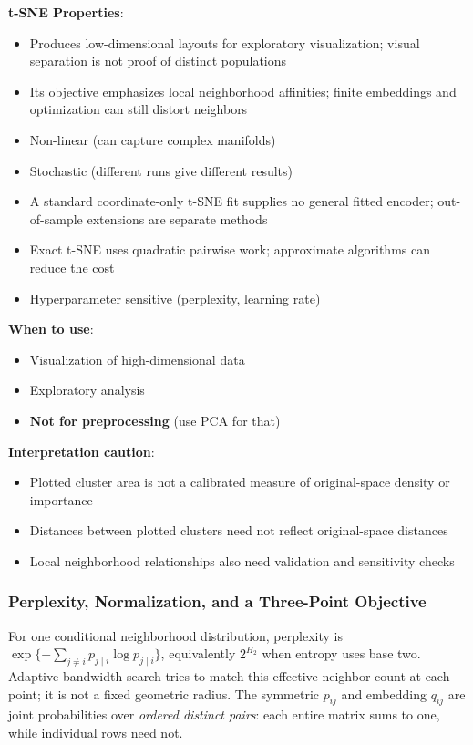 \documentclass[11pt,twoside]{article}
\numberwithin{equation}{section}
\theoremstyle{plain}
\theoremstyle{definition}
\theoremstyle{remark}
\newenvironment{keyidea}{
  \begin{tcolorbox}[colback=yellow!5!white,
                    colframe=yellow!50!black,
                    title=Key Idea,
                    breakable,
                    enhanced,
                    sharp corners,
                    boxrule=0.8pt,
                    left=6pt, right=6pt, top=6pt, bottom=6pt]
}{
  \end{tcolorbox}
}
\begin{document}
\begin{keyidea}
\textbf{t-SNE Properties}:
\begin{itemize}
\item Produces low-dimensional layouts for exploratory visualization; visual separation is not proof of distinct populations
\item Its objective emphasizes local neighborhood affinities; finite embeddings and optimization can still distort neighbors
\item Non-linear (can capture complex manifolds)
\item Stochastic (different runs give different results)
\item A standard coordinate-only t-SNE fit supplies no general fitted encoder; out-of-sample extensions are separate methods
\item Exact t-SNE uses quadratic pairwise work; approximate algorithms can reduce the cost
\item Hyperparameter sensitive (perplexity, learning rate)
\end{itemize}

\textbf{When to use}:
\begin{itemize}
\item Visualization of high-dimensional data
\item Exploratory analysis
\item \textbf{Not for preprocessing} (use PCA for that)
\end{itemize}

\textbf{Interpretation caution}:
\begin{itemize}
\item Plotted cluster area is not a calibrated measure of original-space density or importance
\item Distances between plotted clusters need not reflect original-space distances
\item Local neighborhood relationships also need validation and sensitivity checks
\end{itemize}
\end{keyidea}

\subsubsection{Perplexity, Normalization, and a Three-Point Objective}
For one conditional neighborhood distribution, perplexity is $\exp\{-\sum_{j\ne i}p_{j\mid i}\log p_{j\mid i}\}$, equivalently $2^{H_2}$ when entropy uses base two. Adaptive bandwidth search tries to match this effective neighbor count at each point; it is not a fixed geometric radius. The symmetric $p_{ij}$ and embedding $q_{ij}$ are joint probabilities over \emph{ordered distinct pairs}: each entire matrix sums to one, while individual rows need not.
\end{document}
